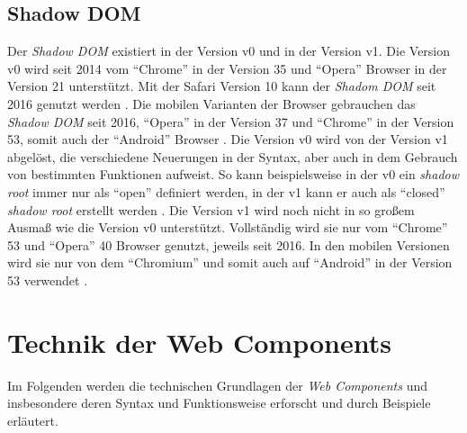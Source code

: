 \documentclass[12pt, paper=a4, bibtotoc, toc=listof, headsepline=true, numbers=endperiod]{scrreprt}
\begin{document}
		\subsection{Shadow DOM}
		Der \emph{Shadow \ac{DOM}} existiert in der Version v0 und in der Version v1. Die Version v0 wird seit 2014 vom \enquote{Chrome} in der Version 35 und \enquote{Opera} Browser in der Version 21 unterstützt. Mit der Safari Version 10 kann der \emph{Shadom \ac{DOM}} seit 2016  genutzt werden \cite{NiwaShaDom}. Die mobilen Varianten der Browser gebrauchen das \emph{Shadow \ac{DOM}} seit 2016, \enquote{Opera} in der Version 37 und \enquote{Chrome} in der Version 53, somit auch der \enquote{Android} Browser \cite{Hayato2016}. Die Version v0 wird von der Version v1 abgelöst, die verschiedene Neuerungen in der Syntax, aber auch in dem Gebrauch von bestimmten Funktionen aufweist. So kann beispielsweise in der v0 ein \emph{shadow root} immer nur als \enquote{open} definiert werden, in der v1 kann er auch als \enquote{closed} \emph{shadow root} erstellt werden \cite{Ito2016}.
		Die Version v1 wird noch nicht in so großem Ausmaß wie die Version v0 unterstützt. Vollständig wird sie nur vom \enquote{Chrome} 53 und \enquote{Opera} 40 Browser genutzt, jeweils seit 2016. In den mobilen Versionen wird sie nur von dem \enquote{Chromium} und somit auch auf \enquote{Android} in der Version 53 verwendet \cite{Hayato2016a}.
	
			
	\section{Technik der Web Components}
	Im Folgenden werden die technischen Grundlagen der \emph{Web Components} und insbesondere deren Syntax und Funktionsweise erforscht und durch Beispiele erläutert.
\end{document}
